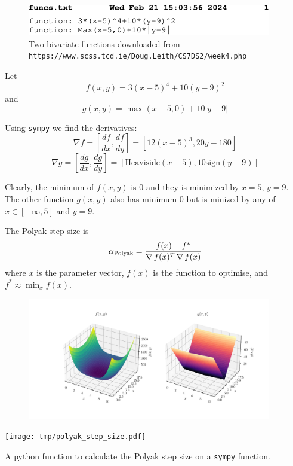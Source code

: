 

\begin{figure}
  \begin{center}
    \includegraphics[width=0.95\textwidth]{funcs.pdf}
  \end{center}
  \caption{Two bivariate functions downloaded from \texttt{https://www.scss.tcd.ie/Doug.Leith/CS7DS2/week4.php}}\label{lst:funcs.txt}
\end{figure}


Let \begin{equation}
  f(x,y)=3(x-5)^4+10(y-9)^2
  \label{eq:f}
\end{equation}
and 
\begin{equation}
  g(x,y)=\max(x-5,0)+10|y-9|
  \label{eq:g}
\end{equation}

Using \texttt{sympy} we find the derivatives:
$$\nabla f=[\frac{df}{dx},\frac{df}{dy}]=[12(x-5)^{3},20y-180]$$
$$\nabla g=[\frac{dg}{dx},\frac{dg}{dy}]=[\text{Heaviside}(x-5),10\text{sign}(y-9)]$$


Clearly, the minimum of $f(x,y)$ is $0$ and they is minimized by $x=5$, $y=9$.
The other function $g(x,y)$ also has minimum $0$ but is minized by any of $x\in[-\infty,5]$ and $y=9$.

The Polyak step size is \begin{equation}
  \alpha_{\text{Polyak}}=\frac{f(x)-f^*}{\operatorname*{\nabla} f(x)^T\operatorname*{\nabla} f(x)}
  \label{eq:polyak-step}
\end{equation}
where $x$ is the parameter vector, $f(x)$ is the function to optimise, and $f^*\approx\min_xf(x)$.

\begin{figure}
  \begin{center}
    \includegraphics[width=0.95\textwidth]{fig/f-g.pdf}
  \end{center}
  \caption{}\label{fig:f-and-g}
\end{figure}

\begin{listing}
  \texttt{[image: tmp/polyak\_step\_size.pdf]}
  \caption{A python function to calculate the Polyak step size on a \texttt{sympy} function.}
  \label{lst:polyak-step}
\end{listing}
